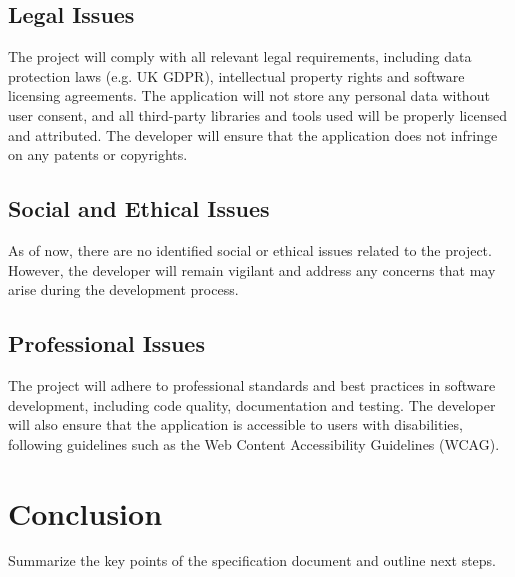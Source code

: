 \documentclass[12pt]{article}
\begin{document}
    \subsection{Legal Issues}
        The project will comply with all relevant legal requirements, including data protection laws (e.g. UK GDPR), intellectual property rights and software licensing agreements. The application
        will not store any personal data without user consent, and all third-party libraries and tools used will be properly licensed and attributed. The developer will ensure that the application does not infringe on any patents or copyrights.

    \subsection{Social and Ethical Issues}
        As of now, there are no identified social or ethical issues related to the project. However, the developer will remain vigilant and address any concerns that may arise during the development process.

    \subsection{Professional Issues}
        The project will adhere to professional standards and best practices in software development, including code quality, documentation and testing. The developer will also ensure that the application is accessible to users with disabilities, following guidelines such as the Web Content Accessibility Guidelines (WCAG).
        
\section{Conclusion}
Summarize the key points of the specification document and outline next steps.
\end{document}

